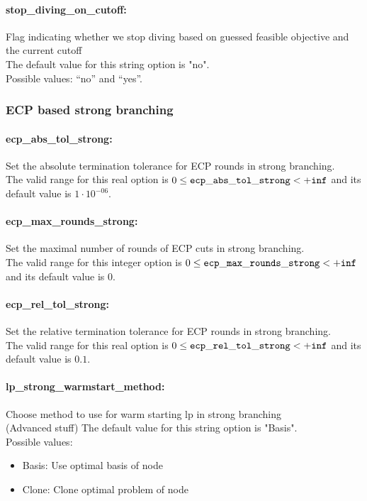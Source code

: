 \paragraph{stop\_diving\_on\_cutoff:}\label{sec:stop_diving_on_cutoff} Flag indicating whether we stop diving based on guessed feasible objective and the current cutoff $\;$ \\
The default value for this string option is "no".
\\ 
Possible values: ``no'' and ``yes''.

\subsubsection{ECP based strong branching}
\label{sec:ECP_based_strong_branching}

\paragraph{ecp\_abs\_tol\_strong:}\label{sec:ecp_abs_tol_strong} Set the absolute termination tolerance for ECP rounds in strong branching. $\;$ \\
 The valid range for this real option is 
$0 \le {\tt ecp\_abs\_tol\_strong } <  {\tt +inf}$
and its default value is $1 \cdot 10^{-06}$.


\paragraph{ecp\_max\_rounds\_strong:}\label{sec:ecp_max_rounds_strong} Set the maximal number of rounds of ECP cuts in strong branching. $\;$ \\
 The valid range for this integer option is
$0 \le {\tt ecp\_max\_rounds\_strong } <  {\tt +inf}$
and its default value is $0$.


\paragraph{ecp\_rel\_tol\_strong:}\label{sec:ecp_rel_tol_strong} Set the relative termination tolerance for ECP rounds in strong branching. $\;$ \\
 The valid range for this real option is 
$0 \le {\tt ecp\_rel\_tol\_strong } <  {\tt +inf}$
and its default value is $0.1$.


\paragraph{lp\_strong\_warmstart\_method:}\label{sec:lp_strong_warmstart_method} Choose method to use for warm starting lp in strong branching $\;$ \\
 (Advanced stuff)
The default value for this string option is "Basis".
\\ 
Possible values:
\begin{itemize}
   \item Basis: Use optimal basis of node
   \item Clone: Clone optimal problem of node
\end{itemize}

